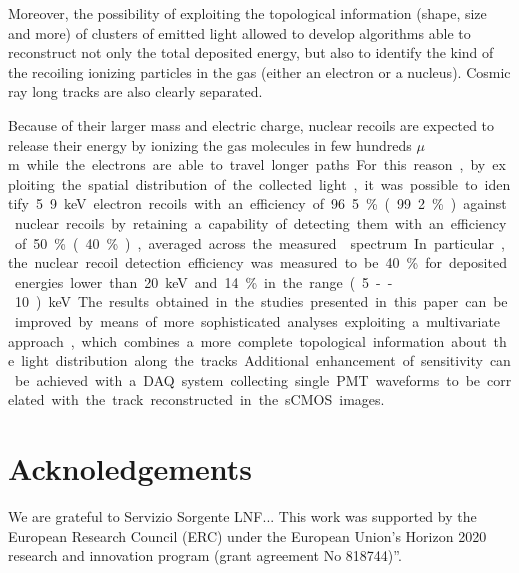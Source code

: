 \documentclass[12pt]{iopart}
\begin{document}
Moreover, the possibility of exploiting the topological information
(shape, size and more) of clusters of emitted light allowed to develop
algorithms able to reconstruct not only the total deposited energy,
but also to identify the kind of the recoiling ionizing particles in
the gas (either an electron or a nucleus). Cosmic ray long tracks are
also clearly separated.

Because of their larger mass and electric charge, nuclear recoils are
expected to release their energy by ionizing the gas molecules in few
hundreds \unit{$\mu$m} while the electrons are able to travel longer
paths. For this reason, by exploiting the spatial distribution of the
collected light, it was possible to identify 5.9\keV electron recoils
with an efficiency of 96.5\% (99.2\%) against nuclear recoils by
retaining a capability of detecting them with an efficiency of 50\%
(40\%), averaged across the measured \ambe spectrum.

In particular, the nuclear recoil detection efficiency was measured to be 40\% for deposited energies lower than 20\keV and 14\% in the range (5--10)\keV.

The results obtained in the studies presented in this paper can be
improved by means of more sophisticated analyses exploiting a
multivariate approach, which combines a more complete topological
information about the light distribution along the tracks.  Additional
enhancement of sensitivity can be achieved with a DAQ system
collecting single PMT waveforms to be correlated with the track
reconstructed in the sCMOS images.

\section{Acknoledgements}
We are grateful to Servizio Sorgente LNF...  This work was supported
by the European Research Council (ERC) under the European Union’s
Horizon 2020 research and innovation program (grant agreement No
818744)”.



\end{document}
